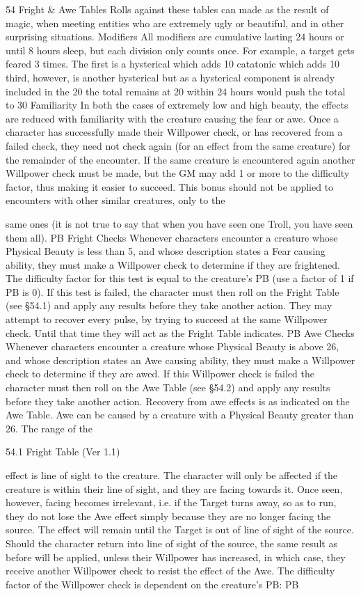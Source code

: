 \documentclass[a4paper]{article}
\begin{document}
\begin{multicols}{3}
54 Fright & Awe Tables
Rolls against these tables can made as the result of
magic, when meeting entities who are extremely
ugly or beautiful, and in other surprising situations.
Modifiers
All modifiers are cumulative lasting 24 hours or
until 8 hours sleep, but each division only counts
once. For example, a target gets feared 3 times.
The first is a hysterical which adds 10%
catatonic which adds 10%
third, however, is another hysterical but as a hysterical component is already included in the 20%
the total remains at 20%
within 24 hours would push the total to 30%
Familiarity
In both the cases of extremely low and high beauty,
the effects are reduced with familiarity with the
creature causing the fear or awe. Once a character
has successfully made their Willpower check, or
has recovered from a failed check, they need not
check again (for an effect from the same creature)
for the remainder of the encounter. If the same
creature is encountered again another Willpower
check must be made, but the GM may add 1 or
more to the difficulty factor, thus making it easier
to succeed. This bonus should not be applied to
encounters with other similar creatures, only to the

same ones (it is not true to say that when you have
seen one Troll, you have seen them all).
PB Fright Checks
Whenever characters encounter a creature whose
Physical Beauty is less than 5, and whose description states a Fear causing ability, they must make a
Willpower check to determine if they are frightened. The difficulty factor for this test is equal to
the creature’s PB (use a factor of 1 if PB is 0). If
this test is failed, the character must then roll on
the Fright Table (see §54.1) and apply any results
before they take another action. They may attempt
to recover every pulse, by trying to succeed at the
same Willpower check. Until that time they will
act as the Fright Table indicates.
PB Awe Checks
Whenever characters encounter a creature whose
Physical Beauty is above 26, and whose description states an Awe causing ability, they must make
a Willpower check to determine if they are awed.
If this Willpower check is failed the character must
then roll on the Awe Table (see §54.2) and apply
any results before they take another action. Recovery from awe effects is as indicated on the Awe
Table. Awe can be caused by a creature with a
Physical Beauty greater than 26. The range of the

54.1 Fright Table (Ver 1.1)

effect is line of sight to the creature. The character
will only be affected if the creature is within their
line of sight, and they are facing towards it. Once
seen, however, facing becomes irrelevant, i.e. if the
Target turns away, so as to run, they do not lose the
Awe effect simply because they are no longer
facing the source. The effect will remain until the
Target is out of line of sight of the source. Should
the character return into line of sight of the source,
the same result as before will be applied, unless
their Willpower has increased, in which case, they
receive another Willpower check to resist the effect
of the Awe.
The difficulty factor of the Willpower check is
dependent on the creature’s PB:
PB


\end{multicols}
\end{document}
